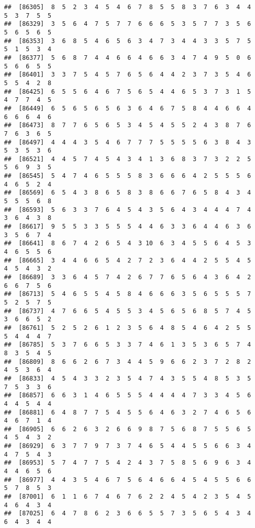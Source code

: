 \documentclass[
]{book}
\begin{document}
\begin{verbatim}
##  [86305]  8  5  2  3  4  5  4  6  7  8  5  5  8  3  7  6  3  4  4  5  3  7  5  5
##  [86329]  3  5  6  4  7  5  7  7  6  6  6  5  3  5  7  7  3  5  6  5  6  5  6  5
##  [86353]  3  6  8  5  4  6  5  6  3  4  7  3  4  4  3  3  5  7  5  5  1  5  3  4
##  [86377]  5  6  8  7  4  4  6  6  4  6  6  3  4  7  4  9  5  0  6  5  6  6  5  5
##  [86401]  3  3  7  5  4  5  7  6  5  6  4  4  2  3  7  3  5  4  6  5  5  4  2  8
##  [86425]  6  5  5  6  4  6  7  5  6  5  4  4  6  5  3  7  3  1  5  4  7  7  4  5
##  [86449]  6  5  6  5  6  5  6  3  6  4  6  7  5  8  4  4  6  6  4  6  6  6  4  6
##  [86473]  8  7  7  6  5  6  5  3  4  5  4  5  5  2  4  3  8  7  6  7  6  3  6  5
##  [86497]  4  4  4  3  5  4  6  7  7  7  5  5  5  5  6  3  8  4  3  5  3  5  3  6
##  [86521]  4  4  5  7  4  5  4  3  4  1  3  6  8  3  7  3  2  2  5  5  6  9  3  5
##  [86545]  5  4  7  4  6  5  5  5  8  3  6  6  6  4  2  5  5  5  6  4  6  5  2  4
##  [86569]  6  5  4  3  8  6  5  8  3  8  6  6  7  6  5  8  4  3  4  5  5  5  6  8
##  [86593]  5  6  3  3  7  6  4  5  4  3  5  6  4  3  4  4  4  7  4  3  6  4  3  8
##  [86617]  9  5  5  3  3  5  5  5  4  4  6  3  3  6  4  4  6  3  6  3  5  6  7  4
##  [86641]  8  6  7  4  2  6  5  4  3 10  6  3  4  5  5  6  4  5  3  4  6  5  5  6
##  [86665]  3  4  4  6  6  5  4  2  7  2  3  6  4  4  2  5  5  4  5  4  5  4  3  2
##  [86689]  3  3  6  4  5  7  4  2  6  7  7  6  5  6  4  3  6  4  2  6  6  7  5  6
##  [86713]  5  4  6  5  5  4  5  8  4  6  6  6  3  5  6  5  5  5  7  5  2  5  7  5
##  [86737]  4  7  6  6  5  4  5  5  3  4  5  6  5  6  8  5  7  4  5  3  6  6  5  2
##  [86761]  5  2  5  2  6  1  2  3  5  6  4  8  5  4  6  4  2  5  5  5  4  4  4  7
##  [86785]  5  3  7  6  6  5  3  3  7  4  6  1  3  5  3  6  5  7  4  8  3  5  4  5
##  [86809]  8  6  6  2  6  7  3  4  4  5  9  6  6  2  3  7  2  8  2  4  5  3  6  4
##  [86833]  4  5  4  3  3  2  3  5  4  7  4  3  5  5  4  8  5  3  5  7  5  3  3  6
##  [86857]  6  6  3  1  4  6  5  5  5  4  4  4  4  7  3  3  4  5  6  4  4  5  4  4
##  [86881]  6  4  8  7  7  5  4  5  5  6  4  6  3  2  7  4  6  5  6  4  6  7  1  4
##  [86905]  6  6  2  6  3  2  6  6  9  8  7  5  6  8  7  5  5  6  5  4  5  4  3  2
##  [86929]  6  3  7  7  9  7  3  7  4  6  5  4  4  5  5  6  6  3  4  4  7  5  4  3
##  [86953]  5  7  4  7  7  5  4  2  4  3  7  5  8  5  6  9  6  3  4  4  4  6  5  6
##  [86977]  4  4  3  5  4  6  7  5  6  4  6  6  4  5  4  5  5  6  6  5  7  8  5  3
##  [87001]  6  1  1  6  7  4  6  7  6  2  2  4  5  4  2  3  5  4  5  4  6  4  3  4
##  [87025]  6  4  7  8  6  2  3  6  6  5  5  7  3  5  6  5  4  3  4  6  4  3  4  4

\end{verbatim}
\end{document}
